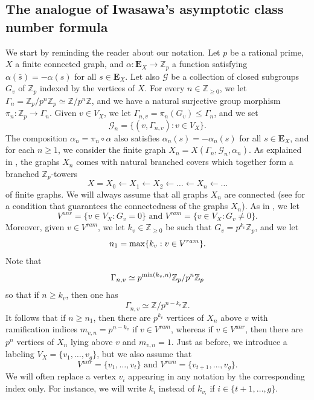 \documentclass[11pt]{amsart}
\numberwithin{equation}{section}
\theoremstyle{remark}
\theoremstyle{definition}
\begin{document}
\subsection{The analogue of Iwasawa's asymptotic class number formula} \label{ana_sec}
We start by reminding the reader about our notation.  Let $p$ be a rational prime, $X$ a finite connected graph, and $\alpha:\mathbf{E}_{X} \rightarrow \mathbb{Z}_{p}$ a function satisfying $\alpha(\bar{s}) = -\alpha(s)$ for all $s \in \mathbf{E}_{X}$.  Let also $\mathcal{G}$ be a collection of closed subgroups $G_{v}$ of $\mathbb{Z}_{p}$ indexed by the vertices of $X$.  For every $n \in \mathbb{Z}_{\ge 0}$, we let $\Gamma_{n} = \mathbb{Z}_{p}/p^{n}\mathbb{Z}_{p} \simeq \mathbb{Z}/p^{n}\mathbb{Z}$, and we have a natural surjective group morphism $\pi_{n}:\mathbb{Z}_{p} \rightarrow \Gamma_{n}$.  Given $v \in V_{X}$, we let $\Gamma_{n,v} = \pi_{n}(G_{v}) \le \Gamma_{n}$, and we set
$$\mathcal{G}_{n} = \{(v,\Gamma_{n,v}): v \in V_{X} \}. $$
The composition $\alpha_{n} = \pi_{n} \circ \alpha$ also satisfies $\alpha_{n}(s) = -\alpha_{n}(s)$ for all $s \in \mathbf{E}_{X}$, and for each $n \ge 1$, we consider the finite graph $X_{n} = X(\Gamma_{n},\mathcal{G}_{n},\alpha_{n})$.  As explained in \cite[\S 4.2]{Gambheera/Vallieres:2024}, the graphs $X_{n}$ comes with natural branched covers which together form a branched $\mathbb{Z}_{p}$-towers 
$$X = X_{0} \leftarrow X_{1} \leftarrow X_{2} \leftarrow \ldots \leftarrow X_{n} \leftarrow \ldots $$
of finite graphs.  We will always assume that all graphs $X_{n}$ are connected (see \cite[\S 4.5]{Gambheera/Vallieres:2024} for a condition that guarantees the connectedness of the graphs $X_{n}$).  As in \cite{Gambheera/Vallieres:2024}, we let
$$V^{unr} = \{v \in V_{X}: G_{v} = 0 \} \text{ and } V^{ram} = \{v \in V_{X}: G_{v} \neq 0 \}. $$
Moreover, given $v \in V^{ram}$, we let $k_{v} \in \mathbb{Z}_{\ge 0}$ be such that $G_{v} = p^{k_{v}}\mathbb{Z}_{p}$, and we let
$$n_{1} = {\rm max}\{k_{v}: v \in V^{ram} \}. $$
Note that
$$\Gamma_{n,v} \simeq p^{{\rm min}(k_{v},n)}\mathbb{Z}_{p}/p^{n}\mathbb{Z}_{p} $$
so that if $n \ge k_{v}$, then one has
$$\Gamma_{n,v} \simeq \mathbb{Z}/p^{n-k_{v}}\mathbb{Z}. $$
It follows that if $n \ge n_{1}$, then there are $p^{k_{v}}$ vertices of $X_{n}$ above $v$ with ramification indices $m_{v,n} = p^{n-k_{v}}$ if $v \in V^{ram}$, whereas if $v \in V^{unr}$, then there are $p^{n}$ vertices of $X_{n}$ lying above $v$ and $m_{v,n} = 1$.  Just as before, we introduce a labeling $V_{X} = \{v_{1},\ldots,v_{g} \}$, but we also assume that 
$$V^{unr} = \{v_{1},\ldots,v_{t} \} \text{ and } V^{ram} = \{v_{t+1},\ldots,v_{g}\}.$$
We will often replace a vertex $v_{i}$ appearing in any notation by the corresponding index only.  For instance, we will write $k_{i}$ instead of $k_{v_{i}}$ if $i \in \{t+1,\ldots,g \}$.
  
\end{document}

